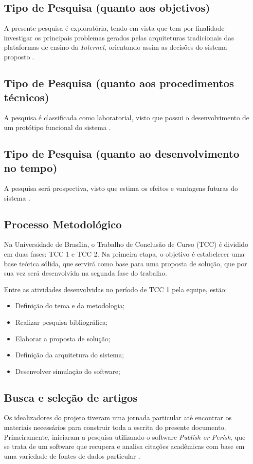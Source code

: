 \subsection{Tipo de Pesquisa (quanto aos objetivos)}
A presente pesquisa é exploratória, tendo em vista que tem por finalidade investigar os principais problemas gerados pelas arquiteturas tradicionais das plataformas de ensino da \textit{Internet}, orientando assim as decisões do sistema proposto \cite{fontelles2009}.

\subsection{Tipo de Pesquisa (quanto aos procedimentos técnicos)}
A pesquisa é classificada como laboratorial, visto que possui o desenvolvimento de um protótipo funcional do sistema \cite{fontelles2009}.

\subsection{Tipo de Pesquisa (quanto ao desenvolvimento no tempo)}
A pesquisa será prospectiva, visto que estima os efeitos e vantagens futuras do sistema \cite{fontelles2009}.

\subsection{Processo Metodológico}
Na Universidade de Brasília, o Trabalho de Conclusão de Curso (TCC) é dividido em duas fases: TCC 1 e TCC 2. Na primeira etapa, o objetivo é estabelecer uma base teórica sólida, que servirá como base para uma proposta de solução, que por sua vez será desenvolvida na segunda fase do trabalho.

Entre as atividades desenvolvidas no período de TCC 1 pela equipe, estão:
\begin{itemize}
    \item Definição do tema e da metodologia;
    \item Realizar pesquisa bibliográfica;
    \item Elaborar a proposta de solução;
    \item Definição da arquitetura do sistema;
    \item Desenvolver simulação do software;
\end{itemize}

\subsection{Busca e seleção de artigos}
Os idealizadores do projeto tiveram uma jornada particular até encontrar os materiais necessários para construir toda a escrita do presente documento. Primeiramente, iniciaram a pesquisa utilizando o software \textit{Publish or Perish}, que se trata de um software que recupera e analisa citações acadêmicas com base em uma variedade de fontes de dados particular \cite{harzing2025publish}.


